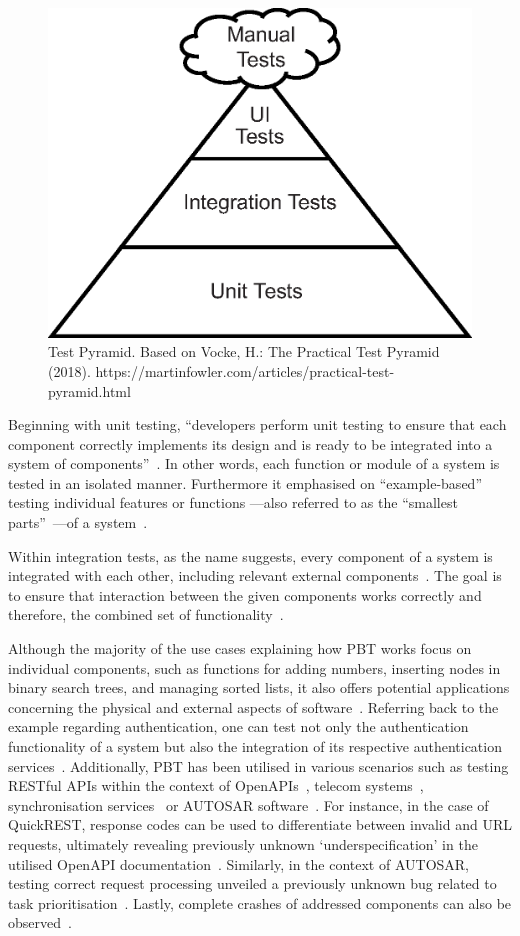 \documentclass[runningheads]{llncs}
\begin{document}
\begin{figure}
  \includegraphics[width=.618\textwidth]{includes/test_pyramid.eps}
  \caption{Test Pyramid. Based on Vocke, H.: The Practical Test Pyramid (2018). https://martinfowler.com/articles/practical-test-pyramid.html}
  \label{fig:test_pyramid}
\end{figure}

Beginning with unit testing, ``developers perform unit testing to ensure that each component correctly implements its design and is ready to be integrated into a system of components''~\cite{Hartmann2000}. In other words, each function or module of a system is tested in an isolated manner. Furthermore it emphasised on ``example-based''~\cite{Corgozinho2023} testing individual features or functions ---also referred to as the ``smallest parts''~\cite{Aniche2022}---of a system~\cite{Hartmann2000,Corgozinho2023}.

Within integration tests, as the name suggests, every component of a system is integrated with each other, including relevant external components~\cite{Aniche2022,Hartmann2000,Radziwill2020}. The goal is to ensure that interaction between the given components works correctly and therefore, the combined set of functionality~\cite{Hartmann2000,Aniche2022}.

Although the majority of the use cases explaining how PBT works focus on individual components, such as functions for adding numbers, inserting nodes in binary search trees,
and managing sorted lists, it also offers potential applications concerning the physical and external aspects of software~\cite{Chen2022}. Referring back to the example regarding authentication, one can test not only the authentication functionality of a system but also the integration of its respective authentication services~\cite{Fink1997}. Additionally, PBT has been utilised in various scenarios such as testing RESTful APIs within the context of OpenAPIs~\cite{Karlsson2019}, telecom systems~\cite{Arts2006}, synchronisation services~\cite{Hughes2016} or AUTOSAR software~\cite{Arts2015}. For instance, in the case of QuickREST, response codes can be used to differentiate between invalid and URL requests, ultimately revealing previously unknown `underspecification' in the utilised OpenAPI documentation~\cite{Karlsson2019}. Similarly, in the context of AUTOSAR, testing correct request processing unveiled a previously unknown bug related to task prioritisation~\cite{Arts2015}. Lastly, complete crashes of addressed components can also be observed~\cite{Arts2006}.
\end{document}
